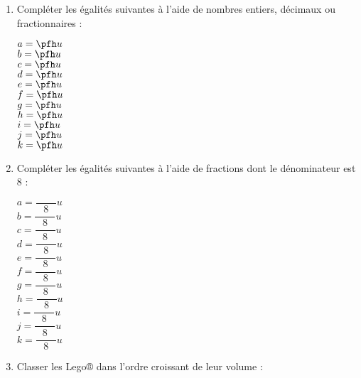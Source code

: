 \begin{activite}
\begin{QCM}
         \begin{enumerate}
            \item Compléter les égalités suivantes à l'aide de nombres entiers, décimaux ou fractionnaires : \\ [-3mm]
               \begin{multicols}{6}
                  $a = \pfh u$ \\ [7mm]
                  $b = \pfh u$ \\ [7mm]
                  $c = \pfh u$ \\ [7mm]
                  $d = \pfh u$ \\ [7mm]
                  $e = \pfh u$ \\ [7mm]
                  $f = \pfh u$ \\ [7mm]
                  $g = \pfh u$ \\ [7mm]
                  $h = \pfh u$ \\ [7mm]
                  $i = \pfh u$ \\ [7mm]
                  $j = \pfh u$ \\ [7mm]
                  $k = \pfh u$ \\ [7mm]
               \end{multicols} \medskip
            \item Compléter les égalités suivantes à l'aide de fractions dont le dénominateur est 8 : \\ [-3mm]
               \begin{multicols}{6}
                  $a = \dfrac{\qquad}{8} u$ \\ [7mm]
                  $b = \dfrac{\qquad}{8} u$ \\ [7mm]
                  $c = \dfrac{\qquad}{8} u$ \\ [7mm]
                  $d = \dfrac{\qquad}{8} u$ \\ [7mm]
                  $e = \dfrac{\qquad}{8} u$ \\ [7mm]
                  $f = \dfrac{\qquad}{8} u$ \\ [7mm]
                  $g = \dfrac{\qquad}{8} u$ \\ [7mm]
                  $h = \dfrac{\qquad}{8} u$ \\ [7mm]
                  $i = \dfrac{\qquad}{8} u$ \\ [7mm]
                  $j = \dfrac{\qquad}{8} u$ \\ [7mm]
                  $k = \dfrac{\qquad}{8} u$ \\ [7mm]
               \end{multicols} \smallskip
            \item Classer les Lego® dans l'ordre croissant de leur volume : \\ [2mm]
               \pf
      \end{enumerate}
   \end{QCM}
\end{activite}


